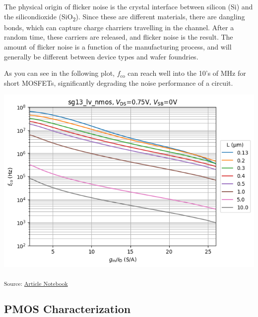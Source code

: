 \documentclass[
  a4paper,
  DIV=11,
  numbers=noendperiod]{scrartcl}
\begin{document}
\begin{tcolorbox}[enhanced jigsaw, breakable, title=\textcolor{quarto-callout-note-color}{\faInfo}\hspace{0.5em}{MOSFET Flicker Noise}, left=2mm, bottomrule=.15mm, opacitybacktitle=0.6, opacityback=0, colframe=quarto-callout-note-color-frame, leftrule=.75mm, bottomtitle=1mm, colbacktitle=quarto-callout-note-color!10!white, toprule=.15mm, rightrule=.15mm, toptitle=1mm, titlerule=0mm, arc=.35mm, colback=white, coltitle=black]

The physical origin of flicker noise is the crystal interface between
silicon (Si) and the silicondioxide (SiO\textsubscript{2}). Since these
are different materials, there are dangling bonds, which can capture
charge charriers travelling in the channel. After a random time, these
carriers are released, and flicker noise is the result. The amount of
flicker noise is a function of the manufacturing process, and will
generally be different between device types and wafer foundries.

\end{tcolorbox}

As you can see in the following plot, \(f_\mathrm{co}\) can reach well
into the 10's of MHz for short MOSFETs, significantly degrading the
noise performance of a circuit.

\includegraphics{index_files/figure-latex/.-sizing-techsweep_sg13_plots_nmos-cell-14-output-1.png}

\textsubscript{Source:
\href{https://iic-jku.github.io/analog-circuit-design/index.qmd.html}{Article
Notebook}}

\subsection{PMOS Characterization}\label{sec-techsweep-pmos}
\end{document}
